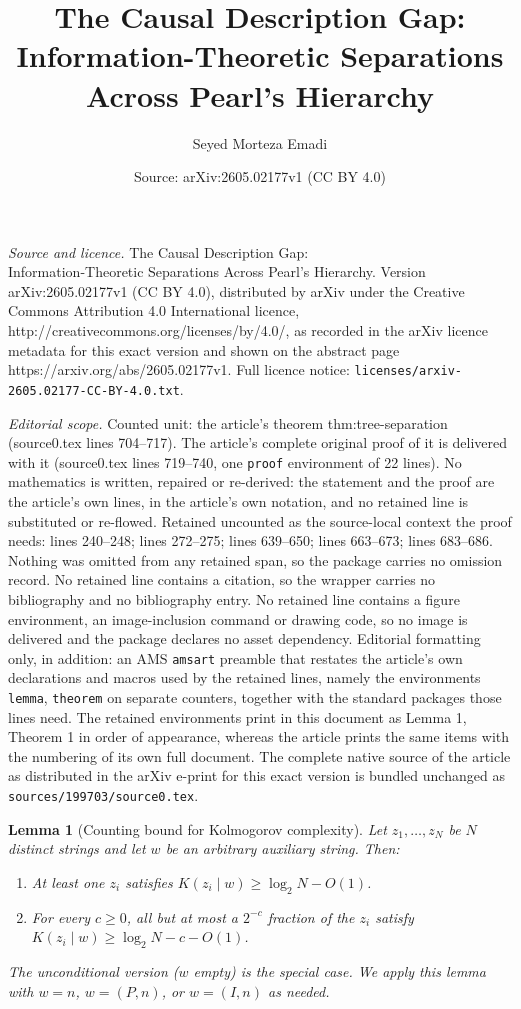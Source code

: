 \documentclass[10pt,a4paper]{amsart}
\title{The Causal Description Gap:\\ Information-Theoretic Separations Across Pearl's Hierarchy}
\author{Seyed Morteza Emadi}
\date{Source: arXiv:2605.02177v1 (CC BY 4.0)}
\newtheorem{lemma}{Lemma}
\begin{document}
\maketitle

\noindent\emph{Source and licence.} The Causal Description Gap:\\ Information-Theoretic Separations Across Pearl's Hierarchy. Version arXiv:2605.02177v1 (CC BY 4.0), distributed by arXiv under the Creative Commons Attribution 4.0 International licence, http://creativecommons.org/licenses/by/4.0/, as recorded in the arXiv licence metadata for this exact version and shown on the abstract page https://arxiv.org/abs/2605.02177v1. Full licence notice: \texttt{licenses/arxiv-2605.02177-CC-BY-4.0.txt}.\par\smallskip

\noindent\textit{Editorial scope.} Counted unit: the article's theorem thm:tree-separation (source0.tex lines 704--717). The article's complete original proof of it is delivered with it (source0.tex lines 719--740, one \texttt{proof} environment of 22 lines). No mathematics is written, repaired or re-derived: the statement and the proof are the article's own lines, in the article's own notation, and no retained line is substituted or re-flowed.  Retained uncounted as the source-local context the proof needs: lines 240--248; lines 272--275; lines 639--650; lines 663--673; lines 683--686.  Nothing was omitted from any retained span, so the package carries no omission record.  No retained line contains a citation, so the wrapper carries no bibliography and no bibliography entry.  No retained line contains a figure environment, an image-inclusion command or drawing code, so no image is delivered and the package declares no asset dependency.  Editorial formatting only, in addition: an AMS \texttt{amsart} preamble that restates the article's own declarations and macros used by the retained lines, namely the environments \texttt{lemma}, \texttt{theorem} on separate counters, together with the standard packages those lines need.  The retained environments print in this document as Lemma 1, Theorem 1 in order of appearance, whereas the article prints the same items with the numbering of its own full document.  The complete native source of the article as distributed in the arXiv e-print for this exact version is bundled unchanged as \texttt{sources/199703/source0.tex}.
\begin{lemma}[Counting bound for Kolmogorov complexity]
\label{lem:counting}
Let $z_1, \ldots, z_N$ be $N$ distinct strings and let $w$ be an arbitrary auxiliary string. Then:
\begin{enumerate}
    \item At least one $z_i$ satisfies $K(z_i \mid w) \geq \log_2 N - O(1)$.
    \item For every $c \geq 0$, all but at most a $2^{-c}$ fraction of the $z_i$ satisfy $K(z_i \mid w) \geq \log_2 N - c - O(1)$.
\end{enumerate}
The unconditional version ($w$ empty) is the special case. We apply this lemma with $w = n$, $w = (P, n)$, or $w = (I, n)$ as needed.
\end{lemma}
\end{document}
